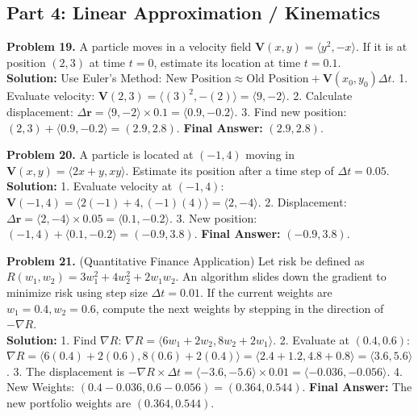 \documentclass[11pt]{article}
\begin{document}
\subsection*{Part 4: Linear Approximation / Kinematics}

\textbf{Problem 19.} A particle moves in a velocity field $\mathbf{V}(x, y) = \langle y^2, -x \rangle$. If it is at position $(2, 3)$ at time $t = 0$, estimate its location at time $t = 0.1$. \\
\textbf{Solution:}
Use Euler's Method: $\text{New Position} \approx \text{Old Position} + \mathbf{V}(x_0, y_0)\Delta t$.
1. Evaluate velocity: $\mathbf{V}(2, 3) = \langle (3)^2, -(2) \rangle = \langle 9, -2 \rangle$.
2. Calculate displacement: $\Delta \mathbf{r} = \langle 9, -2 \rangle \times 0.1 = \langle 0.9, -0.2 \rangle$.
3. Find new position: $(2, 3) + \langle 0.9, -0.2 \rangle = (2.9, 2.8)$.
\textbf{Final Answer:} $(2.9, 2.8)$.

\vspace{0.3cm}
\textbf{Problem 20.} A particle is located at $(-1, 4)$ moving in $\mathbf{V}(x,y) = \langle 2x+y, xy \rangle$. Estimate its position after a time step of $\Delta t = 0.05$. \\
\textbf{Solution:}
1. Evaluate velocity at $(-1, 4)$: $\mathbf{V}(-1, 4) = \langle 2(-1)+4, (-1)(4) \rangle = \langle 2, -4 \rangle$.
2. Displacement: $\Delta \mathbf{r} = \langle 2, -4 \rangle \times 0.05 = \langle 0.1, -0.2 \rangle$.
3. New position: $(-1, 4) + \langle 0.1, -0.2 \rangle = (-0.9, 3.8)$.
\textbf{Final Answer:} $(-0.9, 3.8)$.

\vspace{0.3cm}
\textbf{Problem 21.} (Quantitative Finance Application) Let risk be defined as $R(w_1, w_2) = 3w_1^2 + 4w_2^2 + 2w_1 w_2$. An algorithm slides down the gradient to minimize risk using step size $\Delta t = 0.01$. If the current weights are $w_1 = 0.4, w_2 = 0.6$, compute the next weights by stepping in the direction of $-\nabla R$. \\
\textbf{Solution:}
1. Find $\nabla R$: $\nabla R = \langle 6w_1 + 2w_2, 8w_2 + 2w_1 \rangle$.
2. Evaluate at $(0.4, 0.6)$: $\nabla R = \langle 6(0.4) + 2(0.6), 8(0.6) + 2(0.4) \rangle = \langle 2.4 + 1.2, 4.8 + 0.8 \rangle = \langle 3.6, 5.6 \rangle$.
3. The displacement is $-\nabla R \times \Delta t = \langle -3.6, -5.6 \rangle \times 0.01 = \langle -0.036, -0.056 \rangle$.
4. New Weights: $(0.4 - 0.036, 0.6 - 0.056) = (0.364, 0.544)$.
\textbf{Final Answer:} The new portfolio weights are $(0.364, 0.544)$.
\end{document}
